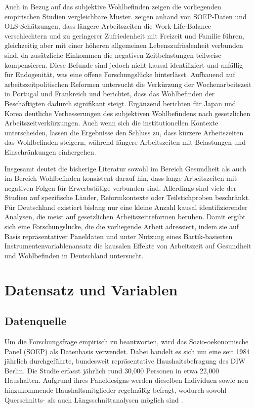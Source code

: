 \documentclass[12pt,a4paper]{article}
\begin{document}
Auch in Bezug auf das subjektive Wohlbefinden zeigen die vorliegenden empirischen Studien vergleichbare Muster. \textcite{holly2012} zeigen anhand von SOEP-Daten und OLS-Schätzungen, dass längere Arbeitszeiten die Work-Life-Balance verschlechtern und zu geringerer Zufriedenheit mit Freizeit und Familie führen, gleichzeitig aber mit einer höheren allgemeinen Lebenszufriedenheit verbunden sind, da zusätzliche Einkommen die negativen Zeitbelastungen teilweise kompensieren. Diese Befunde sind jedoch nicht kausal identifiziert und anfällig für Endogenität, was eine offene Forschungslücke hinterlässt. Aufbauend auf arbeitszeitpolitischen Reformen untersucht \textcite{lepinteur2019} die Verkürzung der Wochenarbeitszeit in Portugal und Frankreich und berichtet, dass das Wohlbefinden der Beschäftigten dadurch signifikant steigt. Ergänzend berichten \textcite{hamermesh2017} für Japan und Korea deutliche Verbesserungen des subjektiven Wohlbefindens nach gesetzlichen Arbeitszeitverkürzungen. Auch wenn sich die institutionellen Kontexte unterscheiden, lassen die Ergebnisse den Schluss zu, dass kürzere Arbeitszeiten das Wohlbefinden steigern, während längere Arbeitszeiten mit Belastungen und Einschränkungen einhergehen.  

Insgesamt deutet die bisherige Literatur sowohl im Bereich Gesundheit als auch im Bereich Wohlbefinden konsistent darauf hin, dass lange Arbeitszeiten mit negativen Folgen für Erwerbstätige verbunden sind. Allerdings sind viele der Studien auf spezifische Länder, Reformkontexte oder Teilstichproben beschränkt. Für Deutschland existiert bislang nur eine kleine Anzahl kausal identifizierender Analysen, die meist auf gesetzlichen Arbeitszeitreformen beruhen. Damit ergibt sich eine Forschungslücke, die die vorliegende Arbeit adressiert, indem sie auf Basis repräsentativer Paneldaten und unter Nutzung eines Bartik-basierten Instrumentenvariablenansatz die kausalen Effekte von Arbeitszeit auf Gesundheit und Wohlbefinden in Deutschland untersucht. 



\section{Datensatz und Variablen}
\subsection{Datenquelle}
Um die Forschungsfrage empirisch zu beantworten, wird das Sozio-oekonomische Panel (SOEP) als Datenbasis verwendet. Dabei handelt es sich um eine seit 1984 jährlich durchgeführte, bundesweit repräsentative Haushaltsbefragung des DIW Berlin.  Die Studie erfasst jährlich rund 30,000 Personen in etwa 22,000 Haushalten. Aufgrund ihres Paneldesigns werden dieselben Individuen sowie neu hinzukommende Haushaltsmitglieder regelmäßig befragt, wodurch sowohl Querschnitts- als auch Längsschnittanalysen möglich sind \parencite{goebel2019}.
\end{document}
